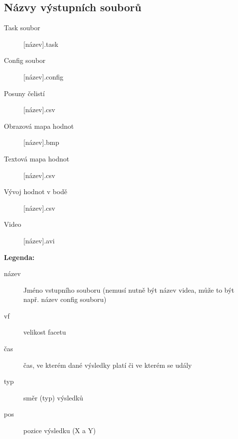 \documentclass[a4paper,12pt]{article}
\begin{document}
\subsection{Názvy výstupních souborů}
\label{sec:names}
\begin{description}
\item [Task soubor] [název]\textunderscore [vf].task
\item [Config soubor] [název]\textunderscore [vf].config
\item [Posuny čelistí] [název]\textunderscore [vf].csv
\item[Obrazová mapa hodnot]  [název]\textunderscore [čas]\textunderscore [typ]\textunderscore [vf].bmp
\item[Textová mapa hodnot] [název]\textunderscore [pos]\textunderscore [vf].csv
\item[Vývoj hodnot v bodě] [název]\textunderscore [čas]\textunderscore [typ]\textunderscore [vf].csv
\item[Video] [název]\textunderscore [typ].avi
\end{description}
\begin{center}\textbf{Legenda:}\end{center}
\begin{description}
\item[název] Jméno vstupního souboru (nemusí nutně být název videa, může to být např. název config souboru)
\item[vf] velikost facetu
\item[čas] čas, ve kterém dané výsledky platí či ve kterém se udály  
\item[typ] směr (typ) výsledků 
\item[pos] pozice výsledku (X a Y)
\end{description}
\end{document}
